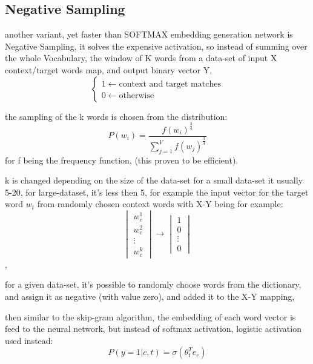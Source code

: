 \documentclass[4apaper,12pt]{book}
\begin{document}
\begin{description}
\begin{description}
\begin{description}
            \subsection{Negative Sampling}
            \begin{description}
            \item another variant, yet faster than SOFTMAX embedding generation network is Negative Sampling, it solves the expensive activation, so instead of summing over the whole Vocabulary, the window of K words from a data-set of input X context/target words map, and output binary vector Y, $$ \begin{cases} 1 \leftarrow \text{context and target matches}\\ 0 \leftarrow \text{otherwise} \end{cases} $$
            \item the sampling of the k words is chosen from the distribution: $$ P(w_i) = \frac{f(w_i)^{\frac{3}{4}}}{\sum_{j=1}^{V}f(w_j)^{\frac{3}{4}}} $$ for f being the frequency function, (this proven to be efficient).
            \item k is changed depending on the size of the data-set for a small data-set it usually 5-20, for large-dataset, it's less then 5, for example the input vector for the target word $w_t$ from randomly chosen context words with X-Y being for example: $$\begin{vmatrix}w_c^1\\w_c^2\\ \vdots\\w_c^k\end{vmatrix}  \rightarrow \begin{vmatrix}1\\0\\ \vdots\\0\end{vmatrix}$$,
              \item for a given data-set, it's possible to randomly choose words from the dictionary, and assign it as negative (with value zero), and added it to the X-Y mapping,
              \item then similar to the skip-gram algorithm, the embedding of each word vector is feed to the neural network, but instead of softmax activation, logistic activation used instead: $$ P(y=1|c,t) = \sigma(\theta_t^Te_c) $$
            \end{description}

\end{description}
\end{description}
\end{description}
\end{document}
